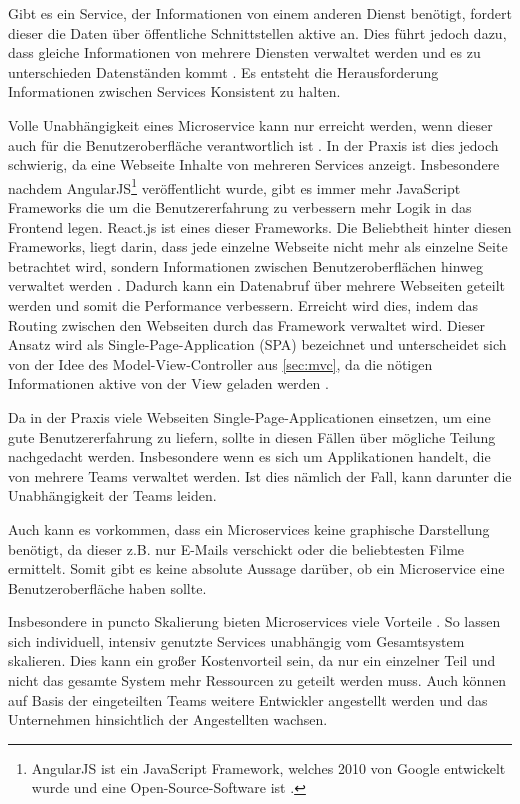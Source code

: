 Gibt es ein Service, der Informationen von einem anderen Dienst benötigt, fordert dieser die Daten über öffentliche Schnittstellen aktive an. Dies führt jedoch dazu, dass gleiche Informationen von mehrere Diensten verwaltet werden und es zu unterschieden Datenständen kommt \parencite[vgl.][Kap. 4.1]{wolff_microservices_2018}. Es entsteht die Herausforderung Informationen zwischen Services Konsistent zu halten.

Volle Unabhängigkeit eines Microservice kann nur erreicht werden, wenn dieser auch für die Benutzeroberfläche verantwortlich ist \parencite[vgl.][Kap. 4.4]{wolff_microservices_2018}. In der Praxis ist dies jedoch schwierig, da eine Webseite Inhalte von mehreren Services anzeigt. Insbesondere nachdem AngularJS\footnote{AngularJS ist ein JavaScript Framework, welches 2010 von Google entwickelt wurde und eine Open-Source-Software ist \parencite{angularjs}.} veröffentlicht wurde, gibt es immer mehr JavaScript Frameworks die um die Benutzererfahrung zu verbessern mehr Logik in das Frontend legen. React.js ist eines dieser Frameworks. Die Beliebtheit hinter diesen Frameworks, liegt darin, dass jede einzelne Webseite nicht mehr als einzelne Seite betrachtet wird, sondern Informationen zwischen Benutzeroberflächen hinweg verwaltet werden \parencite[vgl.][Kap. 9.1]{wolff_microservices_2018}. Dadurch kann ein Datenabruf über mehrere Webseiten geteilt werden und somit die Performance verbessern. Erreicht wird dies, indem das Routing zwischen den Webseiten durch das Framework verwaltet wird. Dieser Ansatz wird als Single-Page-Application (SPA) bezeichnet und unterscheidet sich von der Idee des Model-View-Controller aus \cref{sec:mvc}, da die nötigen Informationen aktive von der View geladen werden \parencite{single-page-webanwendung_2019}.

Da in der Praxis viele Webseiten Single-Page-Applicationen einsetzen, um eine gute Benutzererfahrung zu liefern, sollte in diesen Fällen über mögliche Teilung nachgedacht werden. Insbesondere wenn es sich um Applikationen handelt, die von mehrere Teams verwaltet werden. Ist dies nämlich der Fall, kann darunter die Unabhängigkeit der Teams leiden.

Auch kann es vorkommen, dass ein Microservices keine graphische Darstellung benötigt, da dieser z.B. nur E-Mails verschickt oder die beliebtesten Filme ermittelt. Somit gibt es keine absolute Aussage darüber, ob ein Microservice eine Benutzeroberfläche haben sollte.

Insbesondere in puncto Skalierung bieten Microservices viele Vorteile \parencite[vgl.][Kap. 2.1.4]{newman_monolith_2019}. So lassen sich individuell, intensiv genutzte Services unabhängig vom Gesamtsystem skalieren. Dies kann ein großer Kostenvorteil sein, da nur ein einzelner Teil und nicht das gesamte System mehr Ressourcen zu geteilt werden muss. Auch können auf Basis der eingeteilten Teams weitere Entwickler angestellt werden und das Unternehmen hinsichtlich der Angestellten wachsen.

